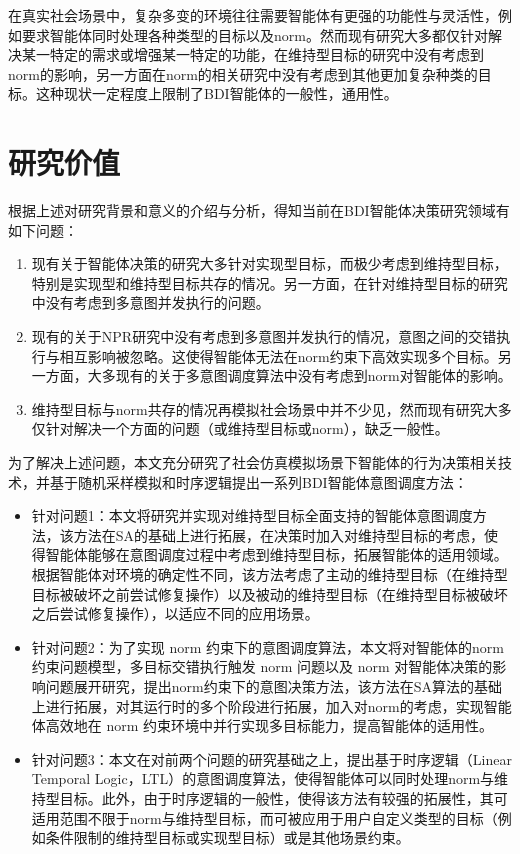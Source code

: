 在真实社会场景中，复杂多变的环境往往需要智能体有更强的功能性与灵活性，例如要求智能体同时处理各种类型的目标以及norm。然而现有研究大多都仅针对解决某一特定的需求或增强某一特定的功能，在维持型目标的研究中没有考虑到norm的影响，另一方面在norm的相关研究中没有考虑到其他更加复杂种类的目标。这种现状一定程度上限制了BDI智能体的一般性，通用性。
\section{研究价值}
根据上述对研究背景和意义的介绍与分析，得知当前在BDI智能体决策研究领域有如下问题：
\begin{enumerate}
  \item 现有关于智能体决策的研究大多针对实现型目标，而极少考虑到维持型目标，特别是实现型和维持型目标共存的情况。另一方面，在针对维持型目标的研究中没有考虑到多意图并发执行的问题。
  \item 现有的关于NPR研究中没有考虑到多意图并发执行的情况，意图之间的交错执行与相互影响被忽略。这使得智能体无法在norm约束下高效实现多个目标。另一方面，大多现有的关于多意图调度算法中没有考虑到norm对智能体的影响。
  \item 维持型目标与norm共存的情况再模拟社会场景中并不少见，然而现有研究大多仅针对解决一个方面的问题（或维持型目标或norm），缺乏一般性。
\end{enumerate}

%
为了解决上述问题，本文充分研究了社会仿真模拟场景下智能体的行为决策相关技术，并基于随机采样模拟和时序逻辑提出一系列BDI智能体意图调度方法：
\begin{itemize}
  \item
针对问题1：本文将研究并实现对维持型目标全面支持的智能体意图调度方法，该方法在SA的基础上进行拓展，在决策时加入对维持型目标的考虑，使得智能体能够在意图调度过程中考虑到维持型目标，拓展智能体的适用领域。根据智能体对环境的确定性不同，该方法考虑了主动的维持型目标（在维持型目标被破坏之前尝试修复操作）以及被动的维持型目标（在维持型目标被破坏之后尝试修复操作），以适应不同的应用场景。
  \item
针对问题2：为了实现 norm 约束下的意图调度算法，本文将对智能体的norm约束问题模型，多目标交错执行触发 norm 问题以及 norm 对智能体决策的影响问题展开研究，提出norm约束下的意图决策方法，该方法在SA算法的基础上进行拓展，对其运行时的多个阶段进行拓展，加入对norm的考虑，实现智能体高效地在 norm 约束环境中并行实现多目标能力，提高智能体的适用性。
  \item
针对问题3：本文在对前两个问题的研究基础之上，提出基于时序逻辑（Linear Temporal Logic，LTL）的意图调度算法，使得智能体可以同时处理norm与维持型目标。此外，由于时序逻辑的一般性，使得该方法有较强的拓展性，其可适用范围不限于norm与维持型目标，而可被应用于用户自定义类型的目标（例如条件限制的维持型目标或实现型目标）或是其他场景约束。
\end{itemize}
%
